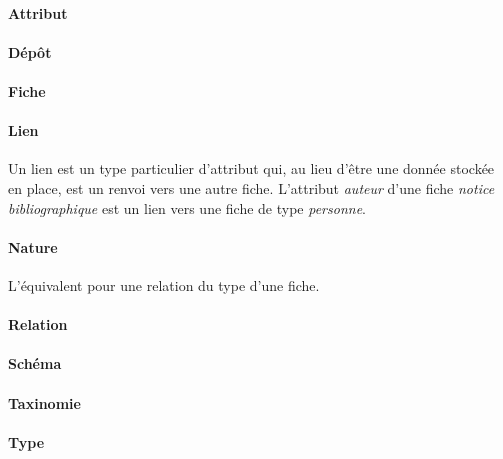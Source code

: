 \documentclass[11pt,french]{article}
\begin{document}
\begin{multicols}{2}


\paragraph{Attribut}


\paragraph{Dépôt}


\paragraph{Fiche}


\paragraph{Lien }

Un lien est un type particulier d'attribut qui, au lieu d'être une
donnée stockée en place, est un renvoi vers une autre fiche. L'attribut
\emph{auteur }d'une fiche \emph{notice bibliographique} est un lien
vers une fiche de type \emph{personne}.


\paragraph{Nature }

L'équivalent pour une relation du type d'une fiche.


\paragraph{Relation}



\paragraph{Schéma}


\paragraph{Taxinomie}


\paragraph{Type}

\end{multicols}
\end{document}
